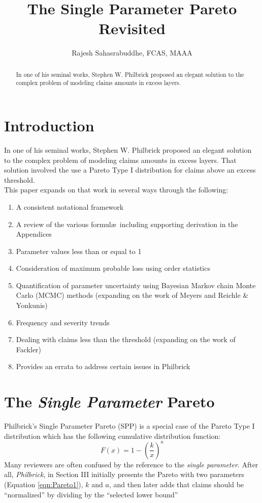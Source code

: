\documentclass[]{article} %
\title{The Single Parameter Pareto Revisited}
\author{Rajesh Sahasrabuddhe, FCAS, MAAA}
\begin{document}
\maketitle

\begin{abstract}
In one of his seminal works, Stephen W. Philbrick proposed an elegant solution to the complex problem of modeling claims amounts in excess layers. 

\end{abstract}

\section{Introduction}
In one of his seminal works, Stephen W. Philbrick\cite{Philbrick} proposed an elegant solution to the complex problem of modeling claims amounts in excess layers. That solution involved the use a Pareto Type I distribution for claims above an excess threshold.\\

This paper expands on that work in several ways through the following:
\begin{enumerate}
	\item A consistent notational framework
	\item A review of the various formul\ae~including supporting derivation in the Appendices
	\item Parameter values less than or equal to 1
	\item Consideration of maximum probable loss using order statistics
	\item Quantification of parameter uncertainty using Bayesian Markov chain Monte Carlo (MCMC) methods (expanding on the work of Meyers and Reichle \& Yonkunis)
	\item Frequency and severity trends
	\item Dealing with claims less than the threshold (expanding on the work of Fackler)
	\item Provides an errata to address certain issues in Philbrick
\end{enumerate}
\section{The \emph{Single Parameter} Pareto}
Philbrick's Single Parameter Pareto (SPP) is a special case of the Pareto Type I distribution which has the following cumulative distribution function:
\begin{equation}
F(x) = 1 - \left(\frac{k}{x} \right)^a\label{eqn:Pareto1}
\end{equation}
Many reviewers are often confused by the reference to the \emph{single parameter}. After all, \emph{Philbrick}, in Section III initially presents the Pareto with two parameters (Equation \ref{eqn:Pareto1}), $k$ and $a$, and then later adds that claims should be ``normalized'' by dividing by the ``selected lower bound''
\end{document}
